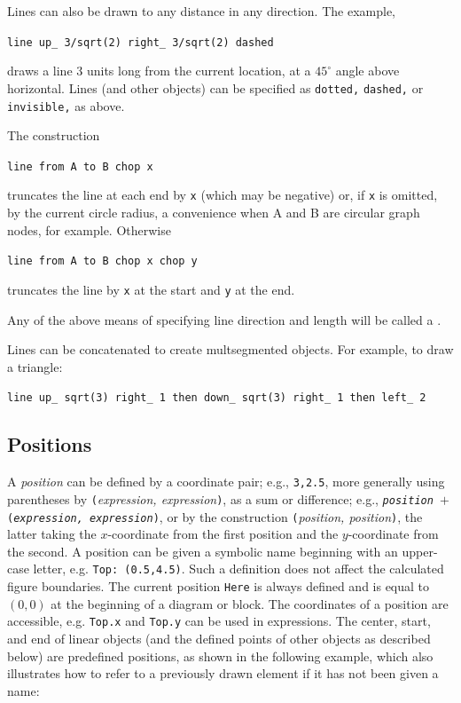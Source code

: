 Lines can also be drawn to any distance in any direction.  The example,

{\tt line up\_ 3/sqrt(2) right\_ 3/sqrt(2) dashed}

\noindent
draws a line 3 units long from the current location,
at a $45^\circ$ angle above horizontal.
Lines (and other objects) can be specified as {\tt dotted,} {\tt dashed,} or
{\tt invisible,} as above.

The construction

{\tt line from A to B chop x}

\noindent
truncates the line at each end by {\tt x} (which may be negative)
or, if {\tt x} is omitted, by
the current circle radius, a convenience when A and B are
circular graph nodes, for example.  Otherwise

{\tt line from A to B chop x chop y}

\noindent
truncates the line by {\tt x} at the start and {\tt y} at the end.

Any of the above means of specifying line direction and length
will be called a \linespec.

Lines can be concatenated to create multsegmented objects.
For example, to draw a triangle:

{\tt line up\_ sqrt(3) right\_ 1 then down\_ sqrt(3) right\_ 1 then left\_ 2}

\subsection{Positions\label{Positions:}}
A {\sl position} can be defined by a coordinate pair;
 e.g., {\tt 3,2.5},
more generally using parentheses by {\tt (}{\sl expression, expression}{\tt )},
as a sum or difference;
 e.g., {\tt{\sl position} $+$ ({\sl expression, expression})},
or by the construction {\tt (}{\sl position, position}{\tt )},
the latter taking the $x$-coordinate from the first
position and the $y$-coordinate from the second.  A position can be
given a symbolic name beginning with an upper-case letter,
e.g. {\tt Top:~(0.5,4.5)}.  Such a definition does not affect the calculated
figure boundaries.  The current position {\tt Here} is always defined and
is equal to $(0,0)$ at the beginning of a diagram or block.
The coordinates of a position are accessible, e.g. {\tt Top.x} and
{\tt Top.y} can be used in expressions.  The center, start, and end of
linear objects (and the defined points of other objects as described below)
are predefined positions, as shown in the following example,
which also illustrates how to refer to a previously drawn element if it has
not been given a name:

